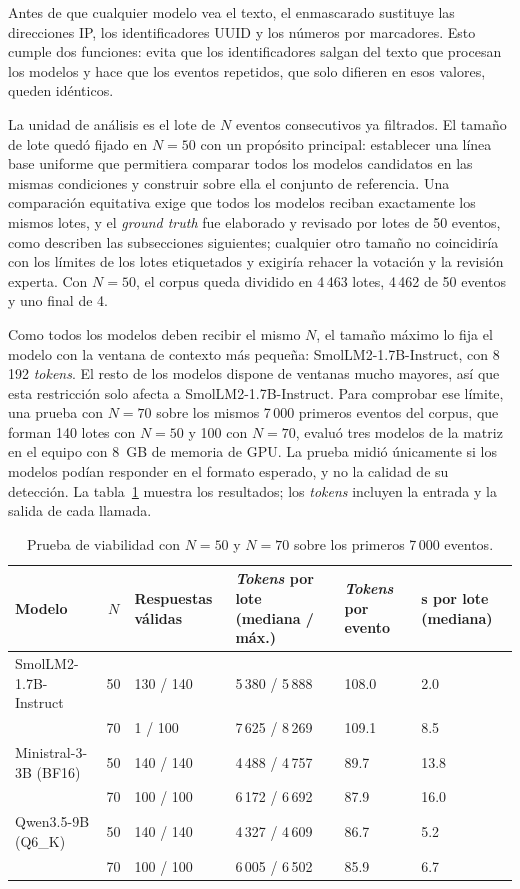 Antes de que cualquier modelo vea el texto, el enmascarado sustituye las direcciones IP, los identificadores UUID y los números por marcadores. Esto cumple dos funciones: evita que los identificadores salgan del texto que procesan los modelos y hace que los eventos repetidos, que solo difieren en esos valores, queden idénticos.

La unidad de análisis es el lote de $N$ eventos consecutivos ya filtrados. El tamaño de lote quedó fijado en $N = 50$ con un propósito principal: establecer una línea base uniforme que permitiera comparar todos los modelos candidatos en las mismas condiciones y construir sobre ella el conjunto de referencia. Una comparación equitativa exige que todos los modelos reciban exactamente los mismos lotes, y el \textit{ground truth} fue elaborado y revisado por lotes de 50 eventos, como describen las subsecciones siguientes; cualquier otro tamaño no coincidiría con los límites de los lotes etiquetados y exigiría rehacer la votación y la revisión experta. Con $N = 50$, el corpus queda dividido en 4\,463 lotes, 4\,462 de 50 eventos y uno final de 4.

Como todos los modelos deben recibir el mismo $N$, el tamaño máximo lo fija el modelo con la ventana de contexto más pequeña: SmolLM2-1.7B-Instruct, con 8\,192 \textit{tokens}. El resto de los modelos dispone de ventanas mucho mayores, así que esta restricción solo afecta a SmolLM2-1.7B-Instruct. Para comprobar ese límite, una prueba con $N = 70$ sobre los mismos 7\,000 primeros eventos del corpus, que forman 140 lotes con $N = 50$ y 100 con $N = 70$, evaluó tres modelos de la matriz en el equipo con 8~GB de memoria de GPU. La prueba midió únicamente si los modelos podían responder en el formato esperado, y no la calidad de su detección. La tabla~\ref{tab:met_n70} muestra los resultados; los \textit{tokens} incluyen la entrada y la salida de cada llamada.

\begin{table}[H]
\centering
\caption{Prueba de viabilidad con $N = 50$ y $N = 70$ sobre los primeros 7\,000 eventos.}
\label{tab:met_n70}
\small
\begin{tabular}{@{}p{3.3cm}cp{1.8cm}p{2.6cm}p{1.6cm}p{1.6cm}@{}}
\toprule
\textbf{Modelo} & $N$ & \textbf{Respuestas válidas} & \textbf{\textit{Tokens} por lote (mediana / máx.)} & \textbf{\textit{Tokens} por evento} & \textbf{s por lote (mediana)} \\
\midrule
SmolLM2-1.7B-Instruct & 50 & 130 / 140 & 5\,380 / 5\,888 & 108.0 & 2.0 \\
 & 70 & 1 / 100 & 7\,625 / 8\,269 & 109.1 & 8.5 \\
Ministral-3-3B (BF16) & 50 & 140 / 140 & 4\,488 / 4\,757 & 89.7 & 13.8 \\
 & 70 & 100 / 100 & 6\,172 / 6\,692 & 87.9 & 16.0 \\
Qwen3.5-9B (Q6\_K) & 50 & 140 / 140 & 4\,327 / 4\,609 & 86.7 & 5.2 \\
 & 70 & 100 / 100 & 6\,005 / 6\,502 & 85.9 & 6.7 \\
\bottomrule
\end{tabular}
\normalsize
\end{table}


